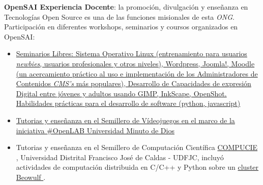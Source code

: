 \documentclass[overlapped,line,final]{../../templates/MichaelDeCorteCV/lib/res}
\begin{document}
\begin{resume}
\begin{position}
\textbf{OpenSAI Experiencia Docente}: la promoción, divulgación y enseñanza en Tecnologías Open Source es una de las funciones misionales de esta \textit{ONG}. Participación en diferentes workshops, seminarios y coursos organizados en OpenSAI:
\begin{itemize}
	\item \href{https://opensai.org/tags/talleres}{Seminarios Libres: Sistema Operativo Linux (entrenamiento para usuarios \textit{newbies}, usuarios profesionales y otros niveles), Wordpress, Joomla!, Moodle (un acercamiento práctico al uso e implementación de los Administradores de Contenidos \textit{CMS's} más populares), Desarrollo de Capacidades de expresión Digital entre jóvenes y adultos usando GIMP, InkScape, OpenShot. Habilidades prácticas para el desarrollo de software (python, javascript) {}}
	\item \href{https://opensai.org/tags/videojuegos}{Tutorias y enseñanza en el Semillero de Vídeojuegos en el marco de la iniciativa \#OpenLAB Universidad Minuto de Dios \faIcon{external-link-alt}}
	\item Tutorias y enseñanza en el Semillero de Computación Científica \href{http://chronos.udistrital.edu.co:8095/siciud/web/Consultas.x?accion=5&idSemillero=2382}{COMPUCIE }, Universidad Distrital Francisco José de Caldas - UDFJC, incluyó actividades de computación distribuida en C/C++ y Python sobre un \href{https://en.wikipedia.org/wiki/Beowulf_cluster}{cluster Beowulf }.
	\end{itemize}
\end{position}



\end{resume}
\end{document}
